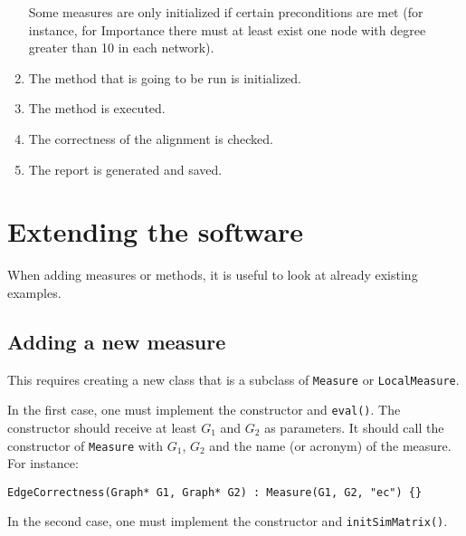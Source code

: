 \documentclass[]{article}
\begin{document}
\begin{enumerate}
Some measures are only initialized if certain preconditions are met (for instance, for Importance there must at least exist one node with degree greater than 10 in each network).

\item The method that is going to be run is initialized.

\item The method is executed.

\item The correctness of the alignment is checked.

\item The report is generated and saved.

\end{enumerate}

\section{Extending the software}

When adding measures or methods, it is useful to look at already existing examples.

\subsection{Adding a new measure}
This requires creating a new class that is a subclass of \texttt{Measure} or \texttt{LocalMeasure}.

In the first case, one must implement the constructor and \texttt{eval()}. The constructor should receive at least $G_1$ and $G_2$ as parameters. It should call the constructor of \texttt{Measure} with $G_1$, $G_2$ and the name (or acronym) of the measure. For instance:
\begin{verbatim}
EdgeCorrectness(Graph* G1, Graph* G2) : Measure(G1, G2, "ec") {}
\end{verbatim}

In the second case, one must implement the constructor and \texttt{initSimMatrix()}.
\end{document}
